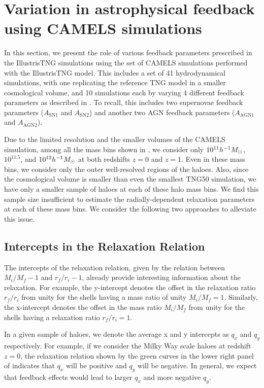 \section{Variation in astrophysical feedback using CAMELS simulations}
\label{sec:res-physvar-CAMELS}
In this section, we present the role of various feedback parameters prescribed in the IllustrisTNG simulations using the set of CAMELS simulations performed with the IllustrisTNG model. This includes a set of 41 hydrodynamical simulations, with one replicating the reference TNG model in a smaller cosmological volume, and 10 simulations each by varying 4 different feedback parameters as described in . To recall, this includes two supernovae feedback parameters ($A_{\mathrm{SN1}}$ and $A_{\mathrm{SN2}}$) and another two AGN feedback parameters ($A_{\mathrm{AGN1}}$ and $A_{\mathrm{AGN2}}$).

Due to the limited resolution and the smaller volumes of the CAMELS simulation, among all the mass bins shown in , we consider only $10^{11} h^{-1}M_{\odot}$, $10^{11.5}$, and $10^{12} h^{-1}M_{\odot}$ at both redshifts $z=0$ and $z=1$. Even in these mass bins, we consider only the outer well-resolved regions of the haloes. Also, since the cosmological volume is smaller than even the smallest TNG50 simulation, we have only a smaller sample of haloes at each of these halo mass bins. We find this sample size insufficient to estimate the radially-dependent relaxation parameters at each of these mass bins. We consider the following two approaches to alleviate this issue.

\subsection*{Intercepts in the Relaxation Relation}

The intercepts of the relaxation relation, given by the relation between $M_i/M_f-1$ and $r_f/r_i-1$, already provide interesting information about the relaxation. For example, the y-intercept denotes the offset in the relaxation ratio $r_f/r_i$ from unity for the shells having a mass ratio of unity $M_i/M_f=1$. Similarly, the x-intercept denotes the offset in the mass ratio $M_i/M_f$ from unity for the shells having a relaxation ratio $r_f/r_i = 1$.

In a given sample of haloes, we denote the average x and y intercepts as $q_x$ and $q_y$ respectively. For example, if we consider the Milky Way scale haloes at redshift $z=0$, the relaxation relation shown by the green curves in the lower right panel of  indicates that $q_x$ will be positive and $q_y$ will be negative. In general, we expect that feedback effects would lead to larger $q_x$ and more negative $q_y$.

